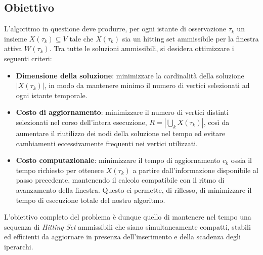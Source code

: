 \subsection*{Obiettivo}

L'algoritmo in questione deve produrre, per ogni istante di osservazione $\tau_k$ un insieme $X(\tau_k) \subseteq V$ tale che $X(\tau_k)$ sia un hitting set ammissibile per la finestra attiva $W(\tau_k)$.
Tra tutte le soluzioni ammissibili, si desidera ottimizzare i seguenti criteri:
\begin{itemize}
    \item \textbf{Dimensione della soluzione}: minimizzare la cardinalità della soluzione $|X(\tau_k)|$, in modo da mantenere minimo il numero di vertici selezionati ad ogni istante temporale.
    \item \textbf{Costo di aggiornamento}: minimizzare il numero di vertici distinti selezionati nel corso dell'intera esecuzione, $R=\left|\bigcup_{k} X(\tau_k)\right|$, così da aumentare il riutilizzo dei nodi della soluzione nel tempo ed evitare cambiamenti eccessivamente frequenti nei vertici utilizzati.
    \item \textbf{Costo computazionale}: minimizzare il tempo di aggiornamento $c_k$ ossia il tempo richiesto per ottenere $X(\tau_k)$ a partire dall'informazione disponibile al passo precedente, mantenendo il calcolo compatibile con il ritmo di avanzamento della finestra. Questo ci permette, di riflesso, di minimizzare il tempo di esecuzione totale del nostro algoritmo.
\end{itemize}
L’obiettivo completo del problema è dunque quello di mantenere nel tempo una sequenza di \textit{Hitting Set} ammissibili che siano simultaneamente compatti, stabili ed efficienti da aggiornare in presenza dell'inserimento e della scadenza degli iperarchi.